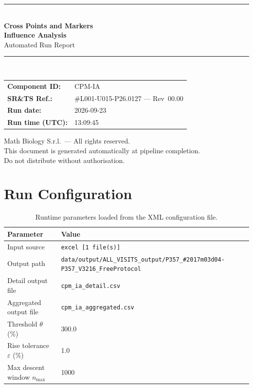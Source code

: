 \documentclass[a4paper,11pt]{article}
\begin{document}
\begin{titlepage}
\begin{center}
  \vspace*{1.8cm}
  {\color{dmaaccent}\rule{\linewidth}{1.5pt}}\\[0.6cm]
  {\LARGE\bfseries\color{dmaaccent}
    Cross Points and Markers\\[0.25cm]
    Influence Analysis}\\[0.4cm]
  {\Large Automated Run Report}\\[0.3cm]
  {\color{dmaaccent}\rule{\linewidth}{1.5pt}}\\[2cm]

  \begin{tabular}{ll}
    \textbf{Component ID:}   & CPM-IA \\[0.3cm]
    \textbf{SR\&TS Ref.:}    & \#L001-U015-P26.0127 --- Rev~00.00 \\[0.3cm]
    \textbf{Run date:}       & 2026-09-23 \\[0.3cm]
    \textbf{Run time (UTC):} & 13:09:45 \\
  \end{tabular}

  \vfill
  {\color{dmagray}\small
    Math Biology S.r.l.\ --- All rights reserved.\\
    This document is generated automatically at pipeline completion.\\
    Do not distribute without authorisation.}
\end{center}
\end{titlepage}

\tableofcontents
\clearpage

\section{Run Configuration}

\begin{table}[h!]
\centering
\small
\caption{Runtime parameters loaded from the XML configuration file.}
\begin{tabular}{ll}
\toprule
\textbf{Parameter} & \textbf{Value} \\
\midrule
Input source                      & \texttt{excel [1 file(s)]} \\
Output path                       & \texttt{data/output/ALL\_VISITS\_output/P357\_\#2017m03d04-P357\_V3216\_FreeProtocol} \\
Detail output file                & \texttt{cpm\_ia\_detail.csv} \\
Aggregated output file            & \texttt{cpm\_ia\_aggregated.csv} \\
Threshold $\theta$ (\%)           & 300.0 \\
Rise tolerance $\varepsilon$ (\%) & 1.0 \\
Max descent window $n_{\max}$     & 1000 \\
\bottomrule
\end{tabular}
\end{table}
\end{document}
